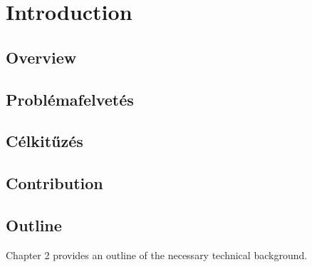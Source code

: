 \chapter{Introduction}

\section{Overview}



\section{Problémafelvetés}



\section{Célkitűzés}



\section{Contribution}



\section{Outline}

Chapter 2 provides an outline of the necessary technical background.
